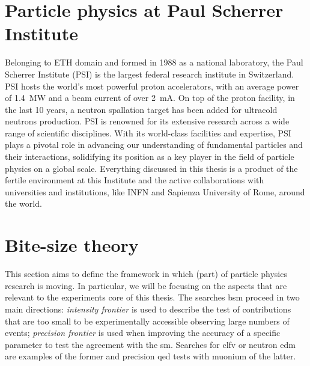 \begin{refsection}
\section{Particle physics at Paul Scherrer Institute} 
    Belonging to ETH domain and formed in 1988 as a national laboratory, the Paul Scherrer Institute (PSI) is the largest federal research institute in Switzerland. 
    PSI hosts the world's most powerful proton accelerators, with an average power of \SI{1.4}{MW} and a beam current of over \SI{2}{mA}.
    On top of the proton facility, in the last 10 years, a neutron spallation target has been added for ultracold neutrons production.  
    PSI is renowned for its extensive research across a wide range of scientific disciplines.
    With its world-class facilities and expertise, PSI plays a pivotal role in advancing our understanding of fundamental particles and their interactions, solidifying its position as a key player in the field of particle physics on a global scale.
    Everything discussed in this thesis is a product of the fertile environment at this Institute and the active collaborations with universities and institutions, like INFN and Sapienza University of Rome, around the world.
    
\section{Bite-size theory}
    This section aims to define the framework in which (part) of particle physics research is moving. 
    In particular, we will be focusing on the aspects that are relevant to the experiments core of this thesis.
    The searches \gls{bsm} proceed in two main directions: \textit{intensity frontier} is used to describe the test of contributions that are too small to be experimentally accessible observing large numbers of events;
    \textit{precision frontier} is used when improving the accuracy of a specific parameter to test the agreement with the \gls{sm}.
    Searches for \gls{clfv} or neutron \gls{edm} are examples of the former and precision \gls{qed} tests with muonium of the latter.


\end{refsection}
